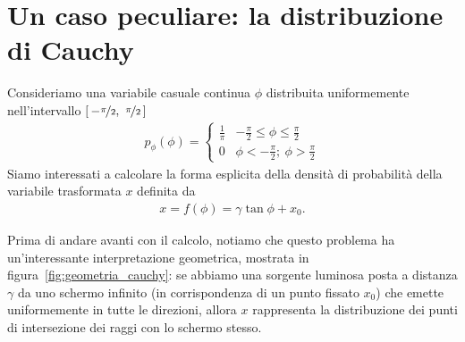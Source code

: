 \section{Un caso peculiare: la distribuzione di Cauchy}

Consideriamo una variabile casuale continua $\phi$ distribuita uniformemente
nell'intervallo $\left[\, -\nicefrac{\pi}{2},~\nicefrac{\pi}{2} \,\right]$
\begin{align*}
  p_\phi(\phi) = \left \{ \begin{array}{ll}
    \displaystyle \frac{1}{\pi} &
    \displaystyle -\frac{\pi}{2} \leq \phi \leq \frac{\pi}{2}\\
    \displaystyle 0 & \displaystyle \phi < -\frac{\pi}{2};~\phi > \frac{\pi}{2}
  \end{array} \right.
\end{align*}
Siamo interessati a calcolare la forma esplicita della densità di
probabilità della variabile trasformata $x$ definita da
\begin{align}\label{eq:trasformazione_cauchy}
  x = f(\phi) = \gamma \tan \phi + x_0.
\end{align}

Prima di andare avanti con il calcolo, notiamo che questo problema ha
un'interessante interpretazione geometrica, mostrata in
figura~\ref{fig:geometria_cauchy}: se abbiamo una sorgente luminosa
posta a distanza $\gamma$ da uno schermo infinito (in corrispondenza di un
punto fissato $x_0$) che emette uniformemente in tutte le direzioni, allora
$x$ rappresenta la distribuzione dei punti di intersezione dei raggi con lo
schermo stesso.

\begin{figure}[htb!]
\end{figure}

